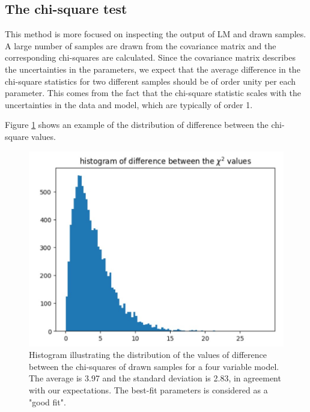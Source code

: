 \documentclass[12pt, TexShade, letterpaper]{report}
\begin{document}
\subsection{The chi-square test}
\label{chap:method,sub:test,subsub:chi}
This method is more focused on inspecting the output of LM and drawn samples. A large number of samples are drawn from the covariance matrix and the corresponding chi-squares are calculated. Since the covariance matrix describes the uncertainties in the parameters, we expect that the average difference in the chi-square statistics for two different samples should be of order unity per each parameter. This comes from the fact that the chi-square statistic scales with the uncertainties in the data and model, which are typically of order 1.\par
Figure \ref{fig:csq_test} shows an example of the distribution of difference between the chi-square values.\par
\begin{figure}[h!]
\centering
\includegraphics[scale =0.9]{chi-sqaure test.jpg}
\caption{Histogram illustrating the distribution of the values of difference between the chi-squares of drawn samples for a four variable model. The average is 3.97 and the standard deviation is 2.83, in agreement with our expectations. The best-fit parameters is considered as a "good fit".}
\label{fig:csq_test}
\end{figure}
\end{document}
